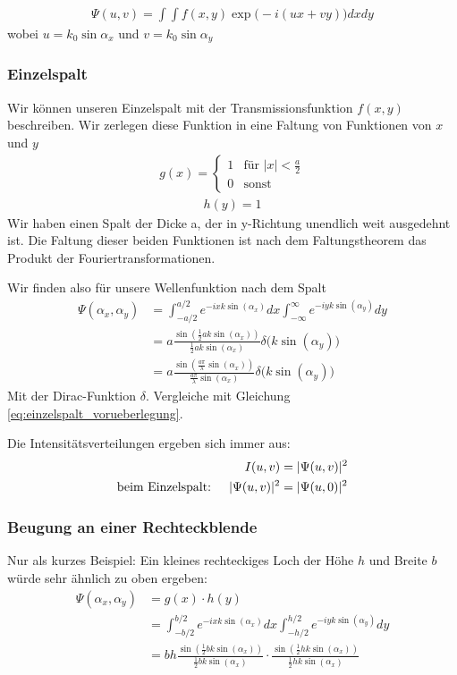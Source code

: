 \documentclass[a4paper]{article}
\begin{document}
\begin{align}
\Psi (u,v) = \int \int f(x,y) \exp\Big(-i(ux+vy)\Big) dx dy
\label{eq:wellenfkt_beugungsbild}
\end{align}
wobei $u= k_0 \sin\alpha_x$ und $v=k_0\sin\alpha_y$
\subsubsection{Einzelspalt}
Wir können unseren Einzelspalt mit der Transmissionsfunktion $f(x,y)$ beschreiben. Wir zerlegen diese Funktion in eine Faltung von Funktionen von $x$ und $y$
\begin{align}
g(x) = \begin{cases} 
1  &\text{für } |x| <  \frac{a}{2} \\
0 & \text{sonst}\end{cases}
\label{eq:einzelspalt}
\end{align}
\begin{align}
h(y) = 1
\end{align}
Wir haben einen Spalt der Dicke a, der in y-Richtung unendlich weit ausgedehnt ist.
Die Faltung dieser beiden Funktionen ist nach dem Faltungstheorem das Produkt der Fouriertransformationen.

Wir finden also für unsere Wellenfunktion nach dem Spalt
\begin{align}
\Psi(\alpha_x,\alpha_y) &= \int_{-a/2}^{a/2} e^{-ixk\sin(\alpha_x)} dx \int_{-\infty}^\infty e^{-iyk\sin(\alpha_y)}dy\\
&= a \frac{\sin(\frac{1}{2} ak\sin(\alpha_x))}{\frac{1}{2} ak\sin(\alpha_x)}\delta\Big(k \sin(\alpha_y)\Big)\\
&= a \frac{\sin( \frac{a\pi}{\lambda} \sin(\alpha_x))}{\frac{a\pi}{\lambda} \sin(\alpha_x)}\delta\Big(k \sin(\alpha_y)\Big)
\end{align}
Mit der Dirac-Funktion $\delta$. Vergleiche mit Gleichung \ref{eq:einzelspalt_vorueberlegung}.

Die Intensitätsverteilungen ergeben sich immer aus:
\begin{align}
I(u,v) &= |\Psi(u,v)|^2\\
\text{beim Einzelspalt: \quad}
|\Psi(u,v)|^2 &= |\Psi(u,0)|^2 
\end{align}
\subsubsection{Beugung an einer Rechteckblende}
Nur als kurzes Beispiel: Ein kleines rechteckiges Loch der Höhe $h$ und Breite $b$ würde sehr ähnlich zu oben ergeben:
\begin{align}
\Psi(\alpha_x,\alpha_y) &= g(x) \cdot h(y) \\
&= \int_{-b/2}^{b/2} e^{-ixk\sin(\alpha_x)} dx \int_{-h/2}^{h/2} e^{-iyk\sin(\alpha_y)}dy\\
&= bh \frac{\sin(\frac{1}{2} bk\sin(\alpha_x))}{\frac{1}{2} bk\sin(\alpha_x)} \cdot \frac{\sin(\frac{1}{2} hk\sin(\alpha_x))}{\frac{1}{2} hk\sin(\alpha_x)}\\
\end{align}
\end{document}
